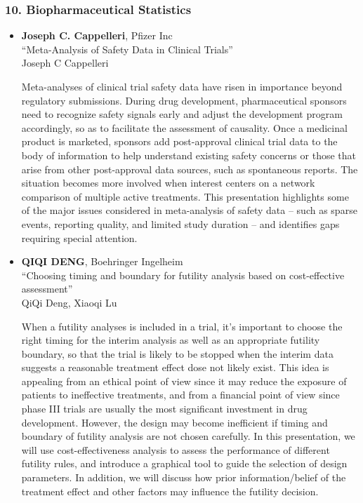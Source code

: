 \subsubsection*{10. Biopharmaceutical Statistics}

\begin{itemize}
\item \textbf{Joseph C. Cappelleri}, Pfizer Inc \\
``Meta-Analysis of Safety Data in Clinical Trials'' \\
Joseph C Cappelleri


Meta-analyses of clinical trial safety data have risen in importance beyond regulatory submissions. During drug development, pharmaceutical sponsors need to recognize safety signals early and adjust the development program accordingly, so as to facilitate the assessment of causality. Once a medicinal product is marketed, sponsors add post-approval clinical trial data to the body of information to help understand existing safety concerns or those that arise from other post-approval data sources, such as spontaneous reports. The situation becomes more involved when interest centers on a network comparison of multiple active treatments.  This presentation highlights some of the major issues considered in meta-analysis of safety data – such as sparse events, reporting quality, and limited study duration – and identifies gaps requiring special attention.   

\item \textbf{QIQI DENG}, Boehringer Ingelheim \\
``Choosing timing and boundary for futility analysis based on cost-effective assessment'' \\
QiQi Deng, Xiaoqi Lu


When a futility analyses is included in a trial, it’s important to choose the right timing for the interim analysis as well as an appropriate futility boundary, so that the trial is likely to be stopped when the interim data suggests a reasonable treatment effect dose not likely exist. This idea is appealing from an ethical point of view since it may reduce the exposure of patients to ineffective treatments, and from a financial point of view since phase III trials are usually the most significant investment in drug development. However, the design may become inefficient if timing and boundary of futility analysis are not chosen carefully. In this presentation, we will use cost-effectiveness analysis to assess the performance of different futility rules, and introduce a graphical tool to guide the selection of design parameters. In addition, we will discuss how prior information/belief of the treatment effect and other factors may influence the futility decision.


\end{itemize}
